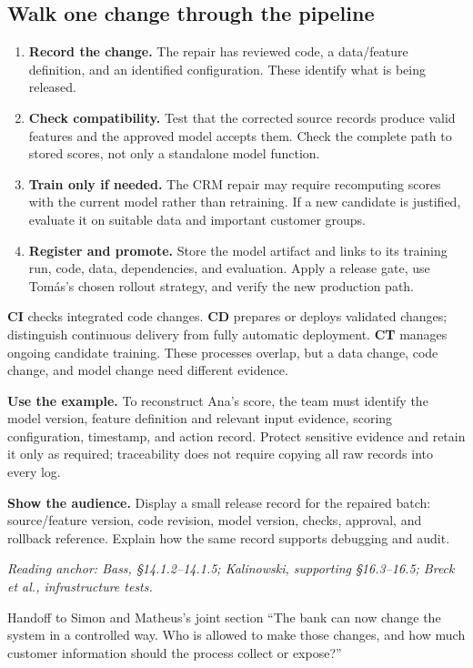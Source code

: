 \documentclass[12pt,a4paper]{article}
\newcommand{\source}[1]{\par\textcolor{teal!70!black}{\textit{Reading anchor: #1}}\par}
\begin{document}
\subsection{Walk one change through the pipeline}
\begin{enumerate}
\item \textbf{Record the change.} The repair has reviewed code, a data/feature definition, and an identified configuration. These identify what is being released.
\item \textbf{Check compatibility.} Test that the corrected source records produce valid features and the approved model accepts them. Check the complete path to stored scores, not only a standalone model function.
\item \textbf{Train only if needed.} The CRM repair may require recomputing scores with the current model rather than retraining. If a new candidate is justified, evaluate it on suitable data and important customer groups.
\item \textbf{Register and promote.} Store the model artifact and links to its training run, code, data, dependencies, and evaluation. Apply a release gate, use Tomás's chosen rollout strategy, and verify the new production path.
\end{enumerate}

\textbf{CI} checks integrated code changes. \textbf{CD} prepares or deploys validated changes; distinguish continuous delivery from fully automatic deployment. \textbf{CT} manages ongoing candidate training. These processes overlap, but a data change, code change, and model change need different evidence.

\textbf{Use the example.} To reconstruct Ana's score, the team must identify the model version, feature definition and relevant input evidence, scoring configuration, timestamp, and action record. Protect sensitive evidence and retain it only as required; traceability does not require copying all raw records into every log.

\textbf{Show the audience.} Display a small release record for the repaired batch: source/feature version, code revision, model version, checks, approval, and rollback reference. Explain how the same record supports debugging and audit.

\source{Bass, \S14.1.2--14.1.5; Kalinowski, supporting \S16.3--16.5; Breck et al., infrastructure tests.}

\begin{handoffbox}{Handoff to Simon and Matheus's joint section}
``The bank can now change the system in a controlled way. Who is allowed to make those changes, and how much customer information should the process collect or expose?''
\end{handoffbox}
\end{document}

